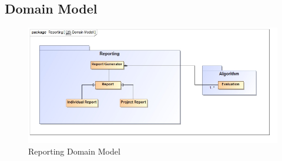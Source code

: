 \documentclass[11pt,a4paper]{article}
\begin{document}
\subsection{Domain Model}
\begin{figure}[H]
	\begin{center}
		\includegraphics[scale=0.55]{../Images/Report_Domain.jpg}
		\caption{Reporting Domain Model}
	\end{center}
\end{figure}

\pagebreak

%
\end{document}
